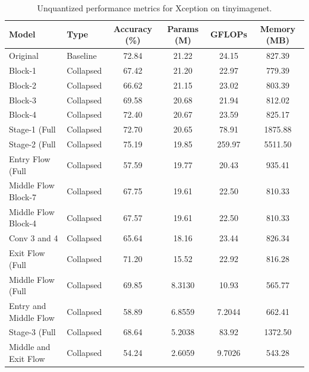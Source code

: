 \begin{table}
\caption{Unquantized performance metrics for Xception on tinyimagenet.}
\label{tab:Xception_tinyimagenet_unquant}
\begin{tabular}{llcccc}
\toprule
Model & Type & Accuracy (\%) & Params (M) & GFLOPs & Memory (MB) \\
\midrule
Original & Baseline & 72.84 & 21.22 & 24.15 & 827.39 \\
Block-1 & Collapsed & 67.42 & 21.20 & 22.97 & 779.39 \\
Block-2 & Collapsed & 66.62 & 21.15 & 23.02 & 803.39 \\
Block-3 & Collapsed & 69.58 & 20.68 & 21.94 & 812.02 \\
Block-4 & Collapsed & 72.40 & 20.67 & 23.59 & 825.17 \\
Stage-1 (Full & Collapsed & 72.70 & 20.65 & 78.91 & 1875.88 \\
Stage-2 (Full & Collapsed & 75.19 & 19.85 & 259.97 & 5511.50 \\
Entry Flow (Full & Collapsed & 57.59 & 19.77 & 20.43 & 935.41 \\
Middle Flow Block-7 & Collapsed & 67.75 & 19.61 & 22.50 & 810.33 \\
Middle Flow Block-4 & Collapsed & 67.57 & 19.61 & 22.50 & 810.33 \\
Conv 3 and 4 & Collapsed & 65.64 & 18.16 & 23.44 & 826.34 \\
Exit Flow (Full & Collapsed & 71.20 & 15.52 & 22.92 & 816.28 \\
Middle Flow (Full & Collapsed & 69.85 & 8.3130 & 10.93 & 565.77 \\
Entry and Middle Flow & Collapsed & 58.89 & 6.8559 & 7.2044 & 662.41 \\
Stage-3 (Full & Collapsed & 68.64 & 5.2038 & 83.92 & 1372.50 \\
Middle and Exit Flow & Collapsed & 54.24 & 2.6059 & 9.7026 & 543.28 \\
\bottomrule
\end{tabular}
\end{table}
